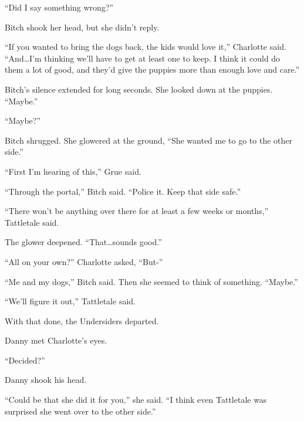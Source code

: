 ``Did I say something wrong?''



Bitch shook her head, but she didn't reply.



``If you wanted to bring the dogs back, the kids would love it,'' Charlotte said.  ``And\ldots I'm thinking we'll have to get at least one to keep.  I think it could do them a lot of good, and they'd give the puppies more than enough love and care.''



Bitch's silence extended for long seconds.  She looked down at the puppies.  ``Maybe.''



``Maybe?''



Bitch shrugged.  She glowered at the ground, ``She wanted me to go to the other side.''



``First I'm hearing of this,'' Grue said.



``Through the portal,'' Bitch said. ``Police it.  Keep that side safe.''



``There won't be anything over there for at least a few weeks or months,'' Tattletale said.



The glower deepened.  ``That\ldots sounds good.''



``All on your own?'' Charlotte asked, ``But-''



``Me and my dogs,'' Bitch said.  Then she seemed to think of something.  ``Maybe.''



``We'll figure it out,'' Tattletale said.



With that done, the Undersiders departed.



Danny met Charlotte's eyes.



``Decided?''



Danny shook his head.



``Could be that she did it for you,'' she said.  ``I think even Tattletale was surprised she went over to the other side.''



